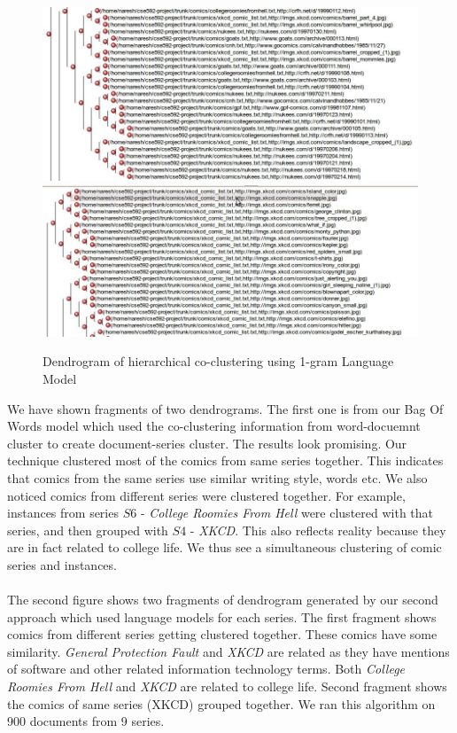\documentclass[11pt]{article}
\begin{document}
 \begin{figure}[H]
   \includegraphics[scale=0.4]{DiffTree}
   \includegraphics[scale=0.4]{SameTree}
   \caption{Dendrogram of hierarchical co-clustering using 1-gram Language Model}
 \end{figure}
We have shown fragments of two dendrograms. The first one is from our Bag Of Words model which used the co-clustering information from word-docuemnt cluster to create document-series cluster. The results look promising. Our technique clustered most of the comics from same series together. This indicates that comics from the same series use similar writing style, words etc. We also noticed comics from different series were clustered together. For example, instances from series $S6$ - \emph{College Roomies From Hell} were clustered with that series, and then grouped with $S4$ - \emph{XKCD}. This also reflects reality because they are in fact related to college life. We thus see a simultaneous clustering of comic series and instances.\\\\
The second figure shows two fragments of dendrogram generated by our second approach which used language models for each series. The first fragment shows comics from different series getting clustered together. These comics have some similarity. \emph{General Protection Fault} and \emph{XKCD} are related as they have mentions of software and other related information technology terms. Both \emph{College Roomies From Hell} and \emph{XKCD} are related to college life. Second fragment shows the comics of same series (XKCD) grouped together. We ran this algorithm on 900 documents from 9 series.\\\\
\end{document}

